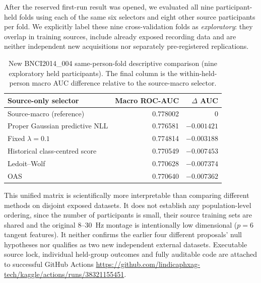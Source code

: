After the reserved first-run result was opened,
we evaluated all nine participant-held folds
using each of the same six selectors and eight
other source participants per fold. We explicitly
label these nine cross-validation folds as
\emph{exploratory}: they overlap in training sources,
include already exposed recording data and
are neither independent new acquisitions nor
separately pre-registered replications.
\begin{table}[tb]\centering\small
\caption{New BNCI2014\_004 same-person-fold
descriptive comparison (nine exploratory
held participants). The final column is
the within-held-person macro AUC difference
relative to the source-macro selector.}
\label{tab:p3-shared-matrix}
\begin{tabular}{lrr}
\toprule
Source-only selector & Macro ROC-AUC & $\Delta$ AUC\\
\midrule
Source-macro (reference) & 0.778002 & 0\\
Proper Gaussian predictive NLL & 0.776581 & $-0.001421$\\
Fixed $\lambda=0.1$ & 0.774814 & $-0.003188$\\
Historical class-centred score & 0.770549 & $-0.007453$\\
Ledoit--Wolf & 0.770628 & $-0.007374$\\
OAS & 0.770640 & $-0.007362$\\
\bottomrule
\end{tabular}
\end{table}

This unified matrix is scientifically more
interpretable than comparing different methods
on disjoint exposed datasets. It does not
establish any population-level ordering,
since the number of participants is small,
their source training sets are shared and
the original 8--30~Hz montage is intentionally
low dimensional ($p=6$ tangent features).
It neither confirms the earlier four different
proposals' null hypotheses nor qualifies as
two new independent external datasets.
Executable source lock, individual held-group
outcomes and fully auditable code are attached
to successful GitHub Actions
\url{https://github.com/lindicaphxag-tech/kaggle/actions/runs/38321155451}.
